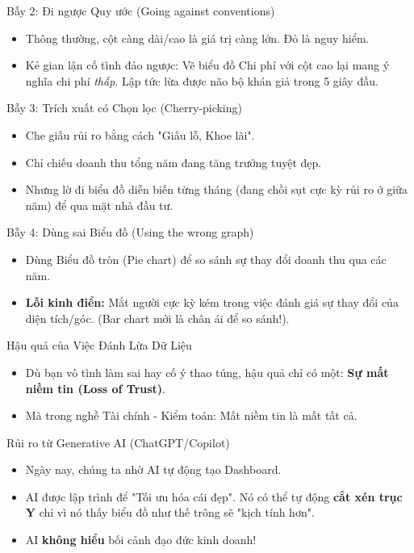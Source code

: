 \documentclass[aspectratio=169,12pt]{beamer}
\begin{document}
\begin{frame}{Bẫy 2: Đi ngược Quy ước (Going against conventions)}
    \begin{itemize}
        \item Thông thường, cột càng dài/cao là giá trị càng lớn. Đỏ là nguy hiểm.
        \item Kẻ gian lận cố tình đảo ngược: Vẽ biểu đồ Chi phí với cột cao lại mang ý nghĩa chi phí \textit{thấp}. Lập tức lừa được não bộ khán giả trong 5 giây đầu.
    \end{itemize}
\end{frame}

\begin{frame}{Bẫy 3: Trích xuất có Chọn lọc (Cherry-picking)}
    \begin{itemize}
        \item Che giấu rủi ro bằng cách "Giấu lỗ, Khoe lãi".
        \item Chỉ chiếu doanh thu tổng năm đang tăng trưởng tuyệt đẹp.
        \item Nhưng lờ đi biểu đồ diễn biến từng tháng (đang chồi sụt cực kỳ rủi ro ở giữa năm) để qua mặt nhà đầu tư.
    \end{itemize}
\end{frame}

\begin{frame}{Bẫy 4: Dùng sai Biểu đồ (Using the wrong graph)}
    \begin{itemize}
        \item Dùng Biểu đồ tròn (Pie chart) để so sánh sự thay đổi doanh thu qua các năm.
        \item \textbf{Lỗi kinh điển:} Mắt người cực kỳ kém trong việc đánh giá sự thay đổi của diện tích/góc. (Bar chart mới là chân ái để so sánh!).
    \end{itemize}
\end{frame}

\begin{frame}{Hậu quả của Việc Đánh Lừa Dữ Liệu}
    \begin{itemize}
        \item Dù bạn vô tình làm sai hay cố ý thao túng, hậu quả chỉ có một: \textbf{Sự mất niềm tin (Loss of Trust)}.
        \item Mà trong nghề Tài chính - Kiểm toán: Mất niềm tin là mất tất cả.
    \end{itemize}
\end{frame}

\begin{frame}{Rủi ro từ Generative AI (ChatGPT/Copilot)}
    \begin{itemize}
        \item Ngày nay, chúng ta nhờ AI tự động tạo Dashboard.
        \item AI được lập trình để "Tối ưu hóa cái đẹp". Nó có thể tự động \textbf{cắt xén trục Y} chỉ vì nó thấy biểu đồ như thế trông sẽ "kịch tính hơn".
        \item AI \textbf{không hiểu} bối cảnh đạo đức kinh doanh!
    \end{itemize}
\end{frame}
\end{document}
